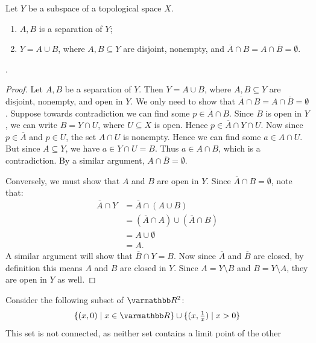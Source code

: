 \begin{lemma}\label{lemma:subspace-connected}
    Let $Y$ be a subspace of a topological space $X$.
        \begin{enumerate}[label = (\arabic*),itemsep=1pt,topsep=3pt]
            \item $A,B$ is a separation of $Y$;
            \item $Y = A \cup B$, where $A,B \subseteq Y$ are disjoint, nonempty, and $\overline{A} \cap B = A \cap \overline{B} = \emptyset$.
        \end{enumerate}.
\end{lemma}
    \begin{proof}
        Let $A,B$ be a separation of $Y$. Then $Y = A \cup B$, where $A,B \subseteq Y$ are disjoint, nonempty, and open in $Y$. We only need to show that $\overline{A} \cap B = A \cap \overline{B} = \emptyset$. Suppose towards contradiction we can find some $p \in \overline{A} \cap B$. Since $B$ is open in $Y$, we can write $B = Y \cap U$, where $U \subseteq X$ is open. Hence $p \in \overline{A} \cap Y \cap U$. Now since $p \in \overline{A}$ and $p \in U$, the set $A \cap U$ is nonempty. Hence we can find some $a \in A \cap U$. But since $A \subseteq Y$, we have $a \in Y \cap U = B$. Thus $a \in A \cap B$, which is a contradiction. By a similar argument, $A \cap \overline{B} = \emptyset$.

        Conversely, we must show that $A$ and $B$ are open in $Y$. Since $\overline{A} \cap B = \emptyset$, note that:
            \begin{equation*}
            \begin{split}
                \overline{A} \cap Y 
                & = \overline{A} \cap (A \cup B) \\
                & = (\overline{A} \cap A ) \cup (\overline{A} \cap B) \\
                & = A \cup \emptyset \\
                & = A.
            \end{split}
            \end{equation*}
        A similar argument will show that $\overline{B} \cap Y = B$. Now since $\overline{A}$ and $\overline{B}$ are closed, by definition this means $A$ and $B$ are closed in $Y$. Since $A = Y \setminus B$ and $B = Y \setminus A$, they are open in $Y$ as well.
    \end{proof}

\begin{example}
    Consider the following subset of $\bfR^2$:
        \begin{equation*}
        \begin{split}
            \{(x,0) \mid x \in \bfR\} \cup \{(x, {\ts \frac{1}{x}}) \mid x > 0\}
        \end{split}
        \end{equation*}
    This set is not connected, as neither set contains a limit point of the other
\end{example}

